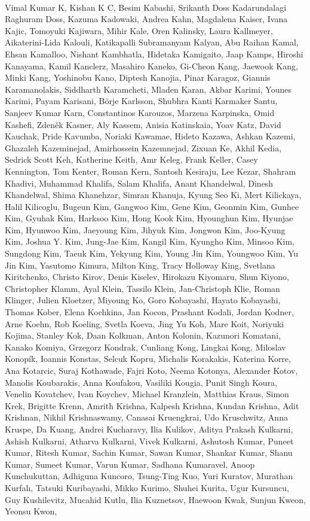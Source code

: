 \paragraph{}Vimal Kumar K, Kishan K C, Besim Kabashi, Srikanth Doss Kadarundalagi Raghuram Doss, Kazuma Kadowaki, Andrea Kahn, Magdalena Kaiser, Ivana Kajic, Tomoyuki Kajiwara, Mihir Kale, Oren Kalinsky, Laura Kallmeyer, Aikaterini-Lida Kalouli, Katikapalli Subramanyam Kalyan, Abu Raihan Kamal, Ehsan Kamalloo, Nishant Kambhatla, Hidetaka Kamigaito, Jaap Kamps, Hiroshi Kanayama, Kamil Kanclerz, Masahiro Kaneko, Gi-Cheon Kang, Jaewook Kang, Minki Kang, Yoshinobu Kano, Diptesh Kanojia, Pinar Karagoz, Giannis Karamanolakis, Siddharth Karamcheti, Mladen Karan, Akbar Karimi, Younes Karimi, Payam Karisani, Börje Karlsson, Shubhra Kanti Karmaker Santu, Sanjeev Kumar Karn, Constantinos Karouzos, Marzena Karpinska, Omid Kashefi, Zdeněk Kasner, Aly Kassem, Anisia Katinskaia, Yoav Katz, David Kauchak, Pride Kavumba, Noriaki Kawamae, Hideto Kazawa, Ashkan Kazemi, Ghazaleh Kazeminejad, Amirhossein Kazemnejad, Zixuan Ke, Akhil Kedia, Sedrick Scott Keh, Katherine Keith, Amr Keleg, Frank Keller, Casey Kennington, Tom Kenter, Roman Kern, Santosh Kesiraju, Lee Kezar, Shahram Khadivi, Muhammad Khalifa, Salam Khalifa, Anant Khandelwal, Dinesh Khandelwal, Shima Khanehzar, Simran Khanuja, Kyung Seo Ki, Mert Kilickaya, Halil Kilicoglu, Bugeun Kim, Gangwoo Kim, Gene Kim, Geonmin Kim, Gunhee Kim, Gyuhak Kim, Harksoo Kim, Hong Kook Kim, Hyounghun Kim, Hyunjae Kim, Hyunwoo Kim, Jaeyoung Kim, Jihyuk Kim, Jongwon Kim, Joo-Kyung Kim, Joshua Y. Kim, Jung-Jae Kim, Kangil Kim, Kyungho Kim, Minsoo Kim, Sungdong Kim, Taeuk Kim, Yekyung Kim, Young Jin Kim, Youngwoo Kim, Yu Jin Kim, Yasutomo Kimura, Milton King, Tracy Holloway King, Svetlana Kiritchenko, Christo Kirov, Denis Kiselev, Hirokazu Kiyomaru, Shun Kiyono, Christopher Klamm, Ayal Klein, Tassilo Klein, Jan-Christoph Klie, Roman Klinger, Julien Kloetzer, Miyoung Ko, Goro Kobayashi, Hayato Kobayashi, Thomas Kober, Elena Kochkina, Jan Kocon, Prashant Kodali, Jordan Kodner, Arne Koehn, Rob Koeling, Svetla Koeva, Jing Yu Koh, Mare Koit, Noriyuki Kojima, Stanley Kok, Daan Kolkman, Anton Kolonin, Kazunori Komatani, Kanako Komiya, Grzegorz Kondrak, Cunliang Kong, Lingkai Kong, Miloslav Konopík, Ioannis Konstas, Selcuk Kopru, Michalis Korakakis, Katerina Korre, Ana Kotarcic, Suraj Kothawade, Fajri Koto, Neema Kotonya, Alexander Kotov, Manolis Koubarakis, Anna Koufakou, Vasiliki Kougia, Punit Singh Koura, Venelin Kovatchev, Ivan Koychev, Michael Kranzlein, Matthias Kraus, Simon Krek, Brigitte Krenn, Amrith Krishna, Kalpesh Krishna, Kundan Krishna, Adit Krishnan, Nikhil Krishnaswamy, Canasai Kruengkrai, Udo Kruschwitz, Anna Kruspe, Da Kuang, Andrei Kucharavy, Ilia Kulikov, Aditya Prakash Kulkarni, Ashish Kulkarni, Atharva Kulkarni, Vivek Kulkarni, Ashutosh Kumar, Puneet Kumar, Ritesh Kumar, Sachin Kumar, Sawan Kumar, Shankar Kumar, Shanu Kumar, Sumeet Kumar, Varun Kumar, Sadhana Kumaravel, Anoop Kunchukuttan, Adhiguna Kuncoro, Tsung-Ting Kuo, Yuri Kuratov, Murathan Kurfalı, Tatsuki Kuribayashi, Mikko Kurimo, Shuhei Kurita, Ugur Kursuncu, Guy Kushilevitz, Mucahid Kutlu, Ilia Kuznetsov, Haewoon Kwak, Sunjun Kweon, Yeonsu Kwon,

